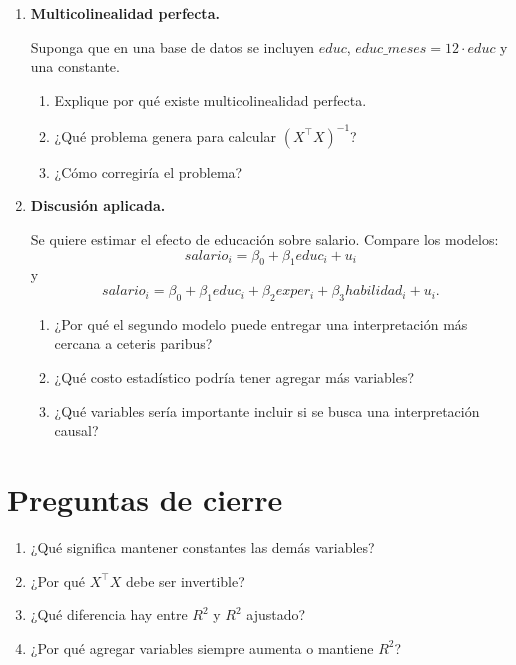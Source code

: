 \documentclass[11pt]{article}
\begin{document}
\begin{enumerate}[label=\textbf{Ejercicio \arabic*.}, leftmargin=*]
\begin{enumerate}[label=\alph*)]
    \item Calcule \(R^2\) para cada modelo.
    \item Calcule \(\overline{R^2}\) para cada modelo.
    \item ¿Cuál modelo preferiría si se quiere penalizar la inclusión de regresores adicionales?
\end{enumerate}

\item \textbf{Multicolinealidad perfecta.}

Suponga que en una base de datos se incluyen \(educ\), \(educ\_meses=12\cdot educ\) y una constante.

\begin{enumerate}[label=\alph*)]
    \item Explique por qué existe multicolinealidad perfecta.
    \item ¿Qué problema genera para calcular \((X^\top X)^{-1}\)?
    \item ¿Cómo corregiría el problema?
\end{enumerate}

\item \textbf{Discusión aplicada.}

Se quiere estimar el efecto de educación sobre salario. Compare los modelos:
\[
salario_i=\beta_0+\beta_1educ_i+u_i
\]
y
\[
salario_i=\beta_0+\beta_1educ_i+\beta_2exper_i+\beta_3habilidad_i+u_i.
\]

\begin{enumerate}[label=\alph*)]
    \item ¿Por qué el segundo modelo puede entregar una interpretación más cercana a ceteris paribus?
    \item ¿Qué costo estadístico podría tener agregar más variables?
    \item ¿Qué variables sería importante incluir si se busca una interpretación causal?
\end{enumerate}

\end{enumerate}

\section*{Preguntas de cierre}

\begin{enumerate}[label=\arabic*.]
    \item ¿Qué significa mantener constantes las demás variables?
    \item ¿Por qué \(X^\top X\) debe ser invertible?
    \item ¿Qué diferencia hay entre \(R^2\) y \(R^2\) ajustado?
    \item ¿Por qué agregar variables siempre aumenta o mantiene \(R^2\)?
\end{enumerate}
\end{document}
